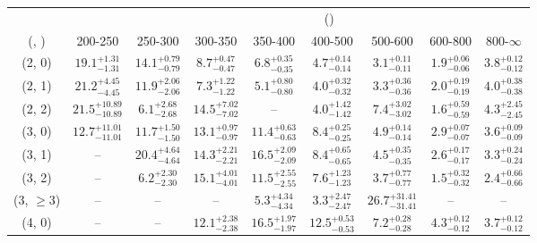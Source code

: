 \begin{table}[h!]
\tiny
\centering
{}
\begin{tabular}
{ccccccccc}
	\hline\hline
&	& \multicolumn{8}{c}{\scalht (\gev)} \\ 
	 (\njet,  \nb) & 200-250 & 250-300 & 300-350 & 350-400 & 400-500 & 500-600 & 600-800 & 800-$\infty$ \\ [0.8ex] 
\hline
	(2, 0) & $19.1^{+ 1.31 }_{- 1.31 }$ & $14.1^{+ 0.79 }_{- 0.79 }$ & $8.7^{+ 0.47 }_{- 0.47 }$ & $6.8^{+ 0.35 }_{- 0.35 }$ & $4.7^{+ 0.14 }_{- 0.14 }$ & $3.1^{+ 0.11 }_{- 0.11 }$ & $1.9^{+ 0.06 }_{- 0.06 }$ & $3.8^{+ 0.12 }_{- 0.12 }$ \\[0.5ex] 
	(2, 1) & $21.2^{+ 4.45 }_{- 4.45 }$ & $11.9^{+ 2.06 }_{- 2.06 }$ & $7.3^{+ 1.22 }_{- 1.22 }$ & $5.1^{+ 0.80 }_{- 0.80 }$ & $4.0^{+ 0.32 }_{- 0.32 }$ & $3.3^{+ 0.36 }_{- 0.36 }$ & $2.0^{+ 0.19 }_{- 0.19 }$ & $4.0^{+ 0.38 }_{- 0.38 }$ \\[0.5ex] 
	(2, 2) & $21.5^{+ 10.89 }_{- 10.89 }$ & $6.1^{+ 2.68 }_{- 2.68 }$ & $14.5^{+ 7.02 }_{- 7.02 }$ & -- & $4.0^{+ 1.42 }_{- 1.42 }$ & $7.4^{+ 3.02 }_{- 3.02 }$ & $1.6^{+ 0.59 }_{- 0.59 }$ & $4.3^{+ 2.45 }_{- 2.45 }$ \\[0.5ex] 
	(3, 0) & $12.7^{+ 11.01 }_{- 11.01 }$ & $11.7^{+ 1.50 }_{- 1.50 }$ & $13.1^{+ 0.97 }_{- 0.97 }$ & $11.4^{+ 0.63 }_{- 0.63 }$ & $8.4^{+ 0.25 }_{- 0.25 }$ & $4.9^{+ 0.14 }_{- 0.14 }$ & $2.9^{+ 0.07 }_{- 0.07 }$ & $3.6^{+ 0.09 }_{- 0.09 }$ \\[0.5ex] 
	(3, 1) & -- & $20.4^{+ 4.64 }_{- 4.64 }$ & $14.3^{+ 2.21 }_{- 2.21 }$ & $16.5^{+ 2.09 }_{- 2.09 }$ & $8.4^{+ 0.65 }_{- 0.65 }$ & $4.5^{+ 0.35 }_{- 0.35 }$ & $2.6^{+ 0.17 }_{- 0.17 }$ & $3.3^{+ 0.24 }_{- 0.24 }$ \\[0.5ex] 
	(3, 2) & -- & $6.2^{+ 2.30 }_{- 2.30 }$ & $15.1^{+ 4.01 }_{- 4.01 }$ & $11.5^{+ 2.55 }_{- 2.55 }$ & $7.6^{+ 1.23 }_{- 1.23 }$ & $3.7^{+ 0.77 }_{- 0.77 }$ & $1.5^{+ 0.32 }_{- 0.32 }$ & $2.4^{+ 0.66 }_{- 0.66 }$ \\[0.5ex] 
	(3, $\ge3$) & -- & -- & -- & $5.3^{+ 4.34 }_{- 4.34 }$ & $3.3^{+ 2.47 }_{- 2.47 }$ & $26.7^{+ 31.41 }_{- 31.41 }$ & -- & -- \\[0.5ex] 
	(4, 0) & -- & -- & $12.1^{+ 2.38 }_{- 2.38 }$ & $16.5^{+ 1.97 }_{- 1.97 }$ & $12.5^{+ 0.53 }_{- 0.53 }$ & $7.2^{+ 0.28 }_{- 0.28 }$ & $4.3^{+ 0.12 }_{- 0.12 }$ & $3.7^{+ 0.12 }_{- 0.12 }$ \\[0.5ex] 

\end{tabular}
\end{table}
